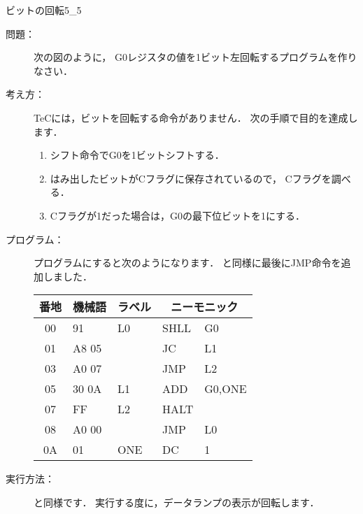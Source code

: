 \newpage
\begin{reidai}{ビットの回転}{5_5}
  \begin{description}
  \item[問題：] 次の図のように，
    G0レジスタの値を1ビット左回転するプログラムを作りなさい．

    \begin{center}
    \end{center}

  \item[考え方：]
    TeCには，ビットを回転する命令がありません．
    次の手順で目的を達成します．
    \begin{enumerate}
    \item シフト命令でG0を1ビットシフトする．
    \item はみ出したビットがCフラグに保存されているので，
      Cフラグを調べる．
    \item Cフラグが1だった場合は，G0の最下位ビットを1にする．
    \end{enumerate}

    \begin{center}
    \end{center}

  \item[プログラム：]
    プログラムにすると次のようになります．
    と同様に最後にJMP命令を追加しました．

    {\ttfamily\small\begin{center}
      \begin{tabular}{|c|l|l|l l|} \hline
        番地 & 機械語 & ラベル & \multicolumn{2}{|c|}{ニーモニック} \\
        \hline
        00 & 91    & L0  & SHLL & G0     \\
        01 & A8 05 &     & JC   & L1     \\
        03 & A0 07 &     & JMP  & L2     \\
        05 & 30 0A & L1  & ADD  & G0,ONE \\
        07 & FF    & L2  & HALT &        \\
        08 & A0 00 &     & JMP  & L0     \\
        0A & 01    & ONE & DC   & 1      \\
        \hline
      \end{tabular}
    \end{center}}

  \item[実行方法：] と同様です．
    実行する度に，データランプの表示が回転します．
  \end{description}
\end{reidai}

